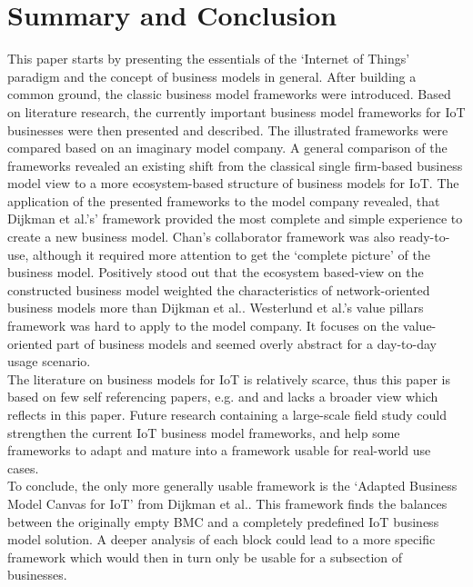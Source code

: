 \section{Summary and Conclusion}
\vspace{-1em}
\label{sec:summary}
	This paper starts by presenting the essentials of the `Internet of Things' paradigm and the concept of business models in general. After building a common ground, the classic business model frameworks were introduced. Based on literature research, the currently important business model frameworks for IoT businesses were then presented and described. The illustrated frameworks were compared based on an imaginary model company. A general comparison of the frameworks revealed an existing shift from the classical single firm-based business model view to a more ecosystem-based structure of business models for IoT. The application of the presented frameworks to the model company revealed, that Dijkman et al.'s' framework provided the most complete and simple experience to create a new business model. Chan's collaborator framework was also ready-to-use, although it required more attention to get the `complete picture' of the business model. Positively stood out that the ecosystem based-view on the constructed business model weighted the characteristics of network-oriented business models more than Dijkman et al.. Westerlund et al.'s value pillars framework was hard to apply to the model company. It focuses on the value-oriented part of business models and seemed overly abstract for a day-to-day usage scenario.\\
	The literature on business models for IoT is relatively scarce, thus this paper is based on few self referencing papers, e.g. \cite{ju} and \cite{dijkman} and lacks a broader view which reflects in this paper. Future research containing a large-scale field study could strengthen the current IoT business model frameworks, and help some frameworks to adapt and mature into a framework usable for real-world use cases.\\
	To conclude, the only more generally usable framework is the `Adapted Business Model Canvas for IoT' from Dijkman et al.. This framework finds the balances between the originally empty BMC and a completely predefined IoT business model solution. A deeper analysis of each block could lead to a more specific framework which would then in turn only be usable for a subsection of businesses.
	\vspace{-10em}
